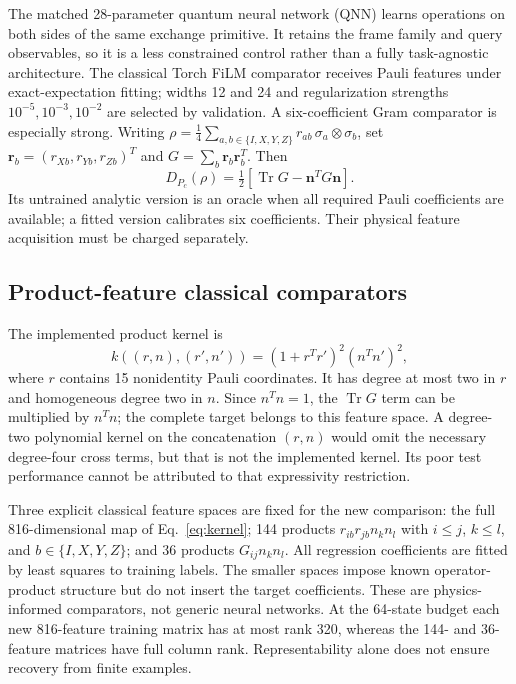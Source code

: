 \documentclass[pdflatex,sn-mathphys-num]{sn-jnl}
\newcommand{\Tr}{\operatorname{Tr}}
\begin{document}
The matched 28-parameter quantum neural network (QNN) learns operations on both sides of the same exchange primitive. It retains the frame family and query observables, so it is a less constrained control rather than a fully task-agnostic architecture. The classical Torch FiLM comparator receives Pauli features under exact-expectation fitting; widths 12 and 24 and regularization strengths $10^{-5},10^{-3},10^{-2}$ are selected by validation. A six-coefficient Gram comparator is especially strong. Writing $\rho=\frac14\sum_{a,b\in\{I,X,Y,Z\}}r_{ab}\,\sigma_a\otimes\sigma_b$, set $\mathbf r_b=(r_{Xb},r_{Yb},r_{Zb})^T$ and $G=\sum_b\mathbf r_b\mathbf r_b^T$. Then
\begin{equation}
 D_{P_c}(\rho)=\tfrac12[\Tr G-\mathbf n^TG\mathbf n].\label{eq:gram}
\end{equation}
Its untrained analytic version is an oracle when all required Pauli coefficients are available; a fitted version calibrates six coefficients. Their physical feature acquisition must be charged separately.

\subsection{Product-feature classical comparators}
The implemented product kernel is
\begin{equation}\label{eq:kernel}
 k((r,n),(r',n'))=(1+r^Tr')^2(n^Tn')^2,
\end{equation}
where $r$ contains 15 nonidentity Pauli coordinates. It has degree at most two in $r$ and homogeneous degree two in $n$. Since $n^Tn=1$, the $\Tr G$ term can be multiplied by $n^Tn$; the complete target belongs to this feature space. A degree-two polynomial kernel on the concatenation $(r,n)$ would omit the necessary degree-four cross terms, but that is not the implemented kernel. Its poor test performance cannot be attributed to that expressivity restriction.

Three explicit classical feature spaces are fixed for the new comparison: the full 816-dimensional map of Eq.~\eqref{eq:kernel}; 144 products $r_{ib}r_{jb}n_kn_l$ with $i\leq j$, $k\leq l$, and $b\in\{I,X,Y,Z\}$; and 36 products $G_{ij}n_kn_l$. All regression coefficients are fitted by least squares to training labels. The smaller spaces impose known operator-product structure but do not insert the target coefficients. These are physics-informed comparators, not generic neural networks. At the 64-state budget each new 816-feature training matrix has at most rank 320, whereas the 144- and 36-feature matrices have full column rank. Representability alone does not ensure recovery from finite examples.
\end{document}
